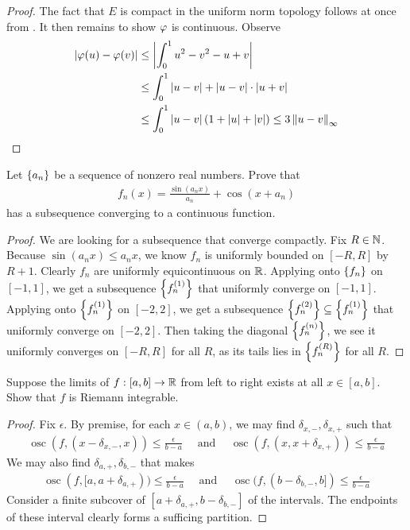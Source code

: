 \documentclass{report}
\begin{document}
\begin{proof}
The fact that $E$ is compact in the uniform norm topology  follows at once from . It then remains to show $\pfi $ is continuous. Observe 
\begin{align*}
  \abso{\pfi  (u)-\pfi  (v)}&\leq   \abso{\int_0^1 u^2-v^2 -u +v}  \\
  & \leq  \int_0^1 \abso{u-v} + \abso{u-v} \cdot \abso{u+v}     \\
  & \leq  \int_0^1 \abso{u-v} \left(1 + \abso{u}+ \abso{v} \right) \leq 3 \norm{u-v}_{\infty} 
\end{align*}
\end{proof}
\begin{question}{}{}
Let $\left\{ a_n \right\}$ be a sequence of nonzero real numbers. Prove that 
\begin{align*}
f_n(x)= \frac{\sin (a_nx)}{a_n} + \cos (x+ a_n)
\end{align*}
has a subsequence converging to a continuous function. 
\end{question}
\begin{proof}
We are looking for a subsequence that converge compactly. Fix $R\in\mathbb{N}$. Because $\sin (a_nx) \leq a_nx$, we know $f_n$ is uniformly bounded on  $[-R,R]$ by $R+1$. Clearly $f_n$ are uniformly equicontinuous on $\mathbb{R}$. Applying  onto $\left\{ f_n \right\}$ on $[-1,1]$, we get a subsequence $\left\{ f_n^{(1)} \right\}$ that uniformly converge on $[-1,1]$. Applying    onto $\left\{ f_n^{(1)} \right\}$ on $[-2,2]$, we get a subsequence $\left\{ f_n^{(2)} \right\} \subseteq \left\{ f_n^{(1)} \right\}$ that uniformly converge on $[-2,2]$. Then taking the diagonal $\left\{ f^{(n)}_n \right\}$, we see it uniformly converges on $[-R,R]$ for all $R$, as its tails lies in  $\left\{ f^{(R)}_n \right\}$ for all $R$.  
\end{proof}
\begin{question}{}{}
Suppose the limits of $f:[a,b]\rightarrow \mathbb{R}$ from left to right exists at all $x\in [a,b]$. Show that $f$ is Riemann integrable. 
\end{question}
\begin{proof}
Fix $\epsilon $. By premise, for each $x \in (a,b)$, we may find $\delta_{x,-},\delta_{x,+}$ such that 
\begin{align*}
\operatorname{osc}(f, (x-\delta_{x,-},x)) \leq \frac{\epsilon }{b-a}\quad  \text{ and }\quad \operatorname{osc}(f,(x,x+\delta_{x,+})) \leq \frac{\epsilon}{b-a}
\end{align*}
We may also find $\delta_{a,+},\delta_{b,-}$ that makes 
\begin{align*}
  \operatorname{osc}(f,[a,a+\delta_{a,+}))\leq \frac{\epsilon}{b-a} \quad \text{ and }\quad \operatorname{osc}(f,(b-\delta_{b,-},b]) \leq \frac{\epsilon}{b-a}
\end{align*}
Consider a finite subcover of  $[a+\delta_{a,+},b-\delta_{b,-}]$ of the intervals. The endpoints of these interval clearly forms a sufficing partition.  
\end{proof}
\end{document}
